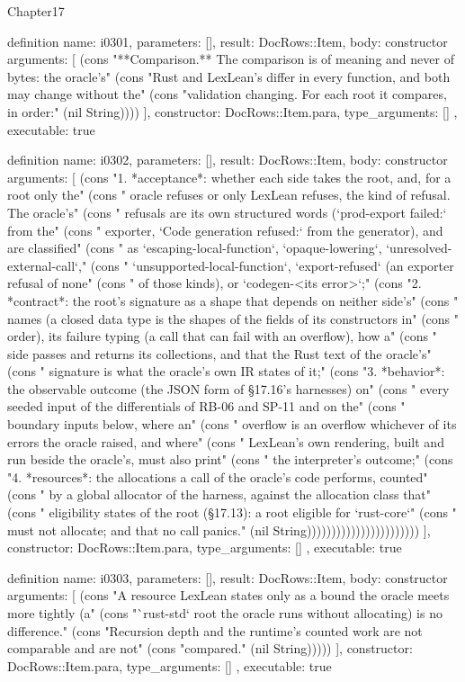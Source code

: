 \begin{lexlean}{Chapter17}
\begin{semanticmodule}
definition{
  name: i0301,
  parameters: [],
  result: DocRows::Item,
  body: constructor{
    arguments: [
      (cons "**Comparison.** The comparison is of meaning and never of bytes: the oracle's" (cons "Rust and LexLean's differ in every function, and both may change without the" (cons "validation changing. For each root it compares, in order:" (nil String))))
    ],
    constructor: DocRows::Item.para,
    type_arguments: []
  },
  executable: true
}

definition{
  name: i0302,
  parameters: [],
  result: DocRows::Item,
  body: constructor{
    arguments: [
      (cons "1. *acceptance*: whether each side takes the root, and, for a root only the" (cons "   oracle refuses or only LexLean refuses, the kind of refusal. The oracle's" (cons "   refusals are its own structured words (`prod-export failed:` from the" (cons "   exporter, `Code generation refused:` from the generator), and are classified" (cons "   as `escaping-local-function`, `opaque-lowering`, `unresolved-external-call`," (cons "   `unsupported-local-function`, `export-refused` (an exporter refusal of none" (cons "   of those kinds), or `codegen-<its error>`;" (cons "2. *contract*: the root's signature as a shape that depends on neither side's" (cons "   names (a closed data type is the shapes of the fields of its constructors in" (cons "   order), its failure typing (a call that can fail with an overflow), how a" (cons "   side passes and returns its collections, and that the Rust text of the oracle's" (cons "   signature is what the oracle's own IR states of it;" (cons "3. *behavior*: the observable outcome (the JSON form of §17.16's harnesses) on" (cons "   every seeded input of the differentials of RB-06 and SP-11 and on the" (cons "   boundary inputs below, where an" (cons "   overflow is an overflow whichever of its errors the oracle raised, and where" (cons "   LexLean's own rendering, built and run beside the oracle's, must also print" (cons "   the interpreter's outcome;" (cons "4. *resources*: the allocations a call of the oracle's code performs, counted" (cons "   by a global allocator of the harness, against the allocation class that" (cons "   eligibility states of the root (§17.13): a root eligible for `rust-core`" (cons "   must not allocate; and that no call panics." (nil String)))))))))))))))))))))))
    ],
    constructor: DocRows::Item.para,
    type_arguments: []
  },
  executable: true
}

definition{
  name: i0303,
  parameters: [],
  result: DocRows::Item,
  body: constructor{
    arguments: [
      (cons "A resource LexLean states only as a bound the oracle meets more tightly (a" (cons "`rust-std` root the oracle runs without allocating) is no difference." (cons "Recursion depth and the runtime's counted work are not comparable and are not" (cons "compared." (nil String)))))
    ],
    constructor: DocRows::Item.para,
    type_arguments: []
  },
  executable: true
}


\end{semanticmodule}
\end{lexlean}
